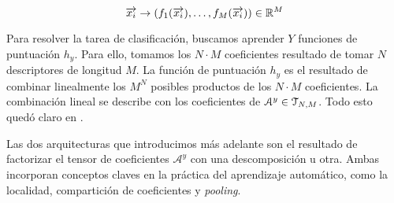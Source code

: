 \begin{equation}
	\overrightarrow{x_i} \to (f_1(\overrightarrow{x_i}), \ldots, f_M(\overrightarrow{x_i})) \in \mathbb{R}^M
\end{equation}

Para resolver la tarea de clasificación, buscamos aprender $Y$ funciones de puntuación $h_y$. Para ello, tomamos los $N \cdot M$ coeficientes resultado de tomar $N$ descriptores de longitud $M$. La función de puntuación $h_y$ es el resultado de combinar linealmente los $M^N$ posibles productos de los $N \cdot M$ coeficientes. La combinación lineal se describe con los coeficientes de $\mathcal{A}^y \in \mathcal{T}_{N, M}$. Todo esto quedó claro en .

Las dos arquitecturas que introducimos más adelante son el resultado de factorizar el tensor de coeficientes $\mathcal{A}^y$ con una descomposición u otra. Ambas incorporan conceptos claves en la práctica del aprendizaje automático, como la localidad, compartición de coeficientes y \textit{pooling}.
